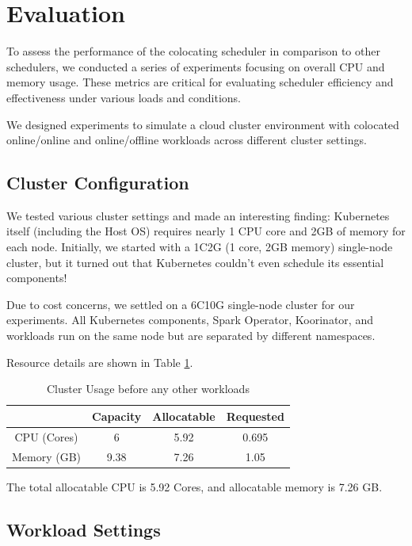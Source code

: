 \section{Evaluation}


To assess the performance of the colocating scheduler in comparison to other schedulers, we conducted a series of experiments focusing on overall CPU and memory usage. These metrics are critical for evaluating scheduler efficiency and effectiveness under various loads and conditions.

We designed experiments to simulate a cloud cluster environment with colocated online/online and online/offline workloads across different cluster settings.

\subsection{Cluster Configuration}

We tested various cluster settings and made an interesting finding: Kubernetes itself (including the Host OS) requires nearly 1 CPU core and 2GB of memory for each node. Initially, we started with a 1C2G (1 core, 2GB memory) single-node cluster, but it turned out that Kubernetes couldn't even schedule its essential components!

Due to cost concerns, we settled on a 6C10G single-node cluster for our experiments. All Kubernetes components, Spark Operator, Koorinator, and workloads run on the same node but are separated by different namespaces.

Resource details are shown in Table \ref{tab:initial}.

\begin{table}
	\centering
	\begin{tabular}{c|ccc}
		            & Capacity & Allocatable & Requested \\
		\hline
		CPU (Cores) & 6        & 5.92        & 0.695     \\
		Memory (GB) & 9.38     & 7.26        & 1.05      \\
	\end{tabular}
	\caption{Cluster Usage before any other workloads}
	\label{tab:initial}
\end{table}
The total allocatable CPU  is 5.92 Cores, and allocatable memory is 7.26 GB.

\subsection{Workload Settings}

